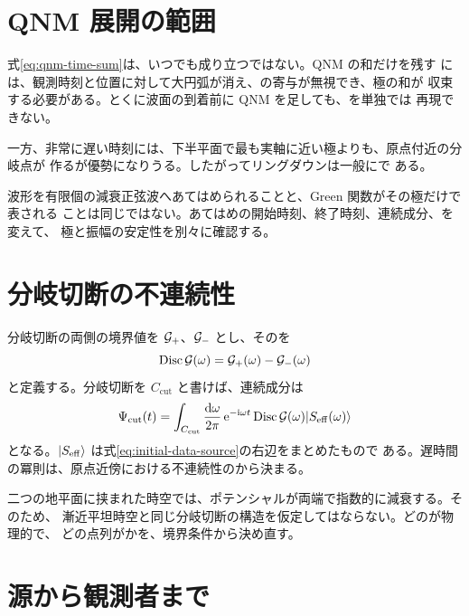\section{QNM 展開の範囲}

式\eqref{eq:qnm-time-sum}は、いつでも成り立つではない。QNM の和だけを残す
には、観測時刻と位置に対して大円弧が消え、の寄与が無視でき、極の和が
収束する必要がある。とくに波面の到着前に QNM を足しても、を単独では
再現できない。

一方、非常に遅い時刻には、下半平面で最も実軸に近い極よりも、原点付近の分岐点が
作るが優勢になりうる。したがってリングダウンは一般にで
ある。

\begin{warningbox}
波形を有限個の減衰正弦波へあてはめられることと、Green 関数がその極だけで表される
ことは同じではない。あてはめの開始時刻、終了時刻、連続成分、を変えて、
極と振幅の安定性を別々に確認する。
\end{warningbox}

\section{分岐切断の不連続性}

分岐切断の両側の境界値を $\mathcal{G}_+$、$\mathcal{G}_-$ とし、そのを
\begin{equation}
\operatorname{Disc}\mathcal{G}(\omega)
=
\mathcal{G}_+(\omega)-\mathcal{G}_-(\omega)
\label{eq:green-discontinuity}
\end{equation}
と定義する。分岐切断を $C_{\mathrm{cut}}$ と書けば、連続成分は
\begin{equation}
\Psi_{\mathrm{cut}}(t)
=
\int_{C_{\mathrm{cut}}}
\frac{\mathrm{d}\omega}{2\pi}\,
\mathrm{e}^{-\mathrm{i}\omega t}
\operatorname{Disc}\mathcal{G}(\omega)
\lvert S_{\mathrm{eff}}(\omega) \rangle
\label{eq:cut-time-response}
\end{equation}
となる。$\lvert S_{\mathrm{eff}} \rangle$ は式\eqref{eq:initial-data-source}の右辺をまとめたもので
ある。遅時間の冪則は、原点近傍における不連続性のから決まる。

二つの地平面に挟まれた時空では、ポテンシャルが両端で指数的に減衰する。そのため、
漸近平坦時空と同じ分岐切断の構造を仮定してはならない。どのが物理的で、
どの点列がかを、境界条件から決め直す。

\section{源から観測者まで}

